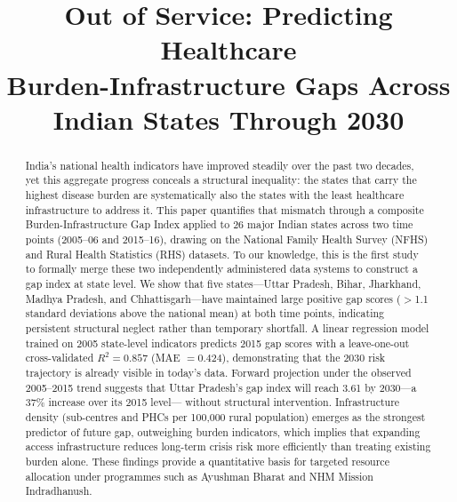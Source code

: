 \documentclass[conference]{IEEEtran}
\begin{document}
\title{Out of Service: Predicting Healthcare\\
Burden-Infrastructure Gaps Across Indian States Through 2030}

\author{
}

\maketitle

\begin{abstract}
India's national health indicators have improved steadily over the
past two decades, yet this aggregate progress conceals a structural
inequality: the states that carry the highest disease burden are
systematically also the states with the least healthcare infrastructure
to address it. This paper quantifies that mismatch through a composite
Burden-Infrastructure Gap Index applied to 26 major Indian states across
two time points (2005--06 and 2015--16), drawing on the National Family
Health Survey (NFHS) and Rural Health Statistics (RHS) datasets.
To our knowledge, this is the first study to formally merge these two
independently administered data systems to construct a gap index
at state level. We show that five states---Uttar Pradesh, Bihar,
Jharkhand, Madhya Pradesh, and Chhattisgarh---have maintained large
positive gap scores ($>$1.1 standard deviations above the national
mean) at both time points, indicating persistent structural neglect
rather than temporary shortfall.
A linear regression model trained on 2005 state-level indicators
predicts 2015 gap scores with a leave-one-out cross-validated
$R^2 = 0.857$ (MAE $= 0.424$), demonstrating that the 2030 risk
trajectory is already visible in today's data. Forward projection
under the observed 2005--2015 trend suggests that Uttar Pradesh's gap
index will reach 3.61 by 2030---a 37\% increase over its 2015 level---
without structural intervention. Infrastructure density (sub-centres and
PHCs per 100,000 rural population) emerges as the strongest predictor
of future gap, outweighing burden indicators, which implies that
expanding access infrastructure reduces long-term crisis risk more
efficiently than treating existing burden alone. These findings provide
a quantitative basis for targeted resource allocation under programmes
such as Ayushman Bharat and NHM Mission Indradhanush.
\end{abstract}
\end{document}
